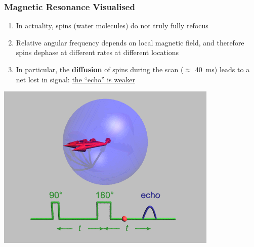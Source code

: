 \begin{frame}
\frametitle{Magnetic Resonance Visualised}
\begin{enumerate}
    \item In actuality, spins (water molecules) do not truly fully refocus
    \item Relative angular frequency depends on local magnetic field, and therefore spins dephase at different rates at different locations
    \item In particular, the \textbf{diffusion} of spins during the scan ($\approx$ \SI{40}{\milli\second}) leads to a net lost in signal: \underline{the ``echo'' is weaker}
\end{enumerate}
\centering
\includegraphics[width=0.4\linewidth]{gifs/HahnEcho_GWM-165}
\end{frame}

